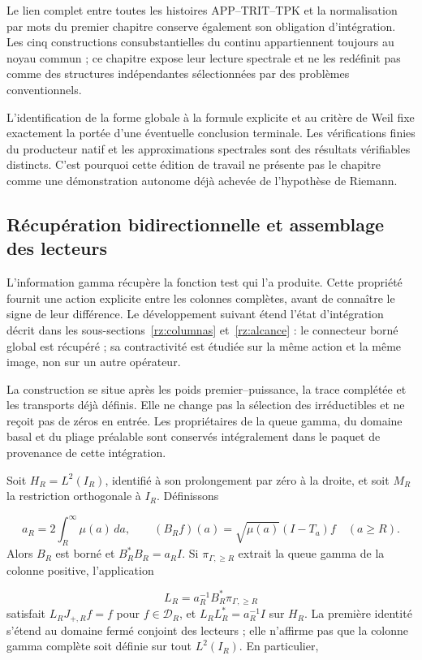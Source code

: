 Le lien complet entre toutes les histoires APP–TRIT–TPK et la normalisation par mots du premier chapitre conserve également son obligation d’intégration. Les cinq constructions consubstantielles du continu appartiennent toujours au noyau commun ; ce chapitre expose leur lecture spectrale et ne les redéfinit pas comme des structures indépendantes sélectionnées par des problèmes conventionnels.

L'identification de la forme globale à la formule explicite et au critère de Weil fixe exactement la portée d'une éventuelle conclusion terminale. Les vérifications finies du producteur natif et les approximations spectrales sont des résultats vérifiables distincts. C'est pourquoi cette édition de travail ne présente pas le chapitre comme une démonstration autonome déjà achevée de l'hypothèse de Riemann.

\subsection{Récupération bidirectionnelle et assemblage des lecteurs}
\label{rz:gamma}
L’information gamma récupère la fonction test qui l’a produite. Cette propriété fournit une action explicite entre les colonnes complètes, avant de connaître le signe de leur différence. Le développement suivant étend l’état d’intégration décrit dans les sous-sections~\ref{rz:columnas} et~\ref{rz:alcance} : le connecteur borné global est récupéré ; sa contractivité est étudiée sur la même action et la même image, non sur un autre opérateur.

La construction se situe après les poids premier–puissance, la trace complétée et les transports déjà définis. Elle ne change pas la sélection des irréductibles et ne reçoit pas de zéros en entrée. Les propriétaires de la queue gamma, du domaine basal et du pliage préalable sont conservés intégralement dans le paquet de provenance de cette intégration.

Soit \(H_R=L^2(I_R)\), identifié à son prolongement par zéro à la droite, et soit \(M_R\) la restriction orthogonale à \(I_R\). Définissons

\[
a_R=2\int_R^\infty\mu(a)\,da,\qquad
(B_Rf)(a)=\sqrt{\mu(a)}(I-T_a)f\quad(a\geq R).
\]
Alors \(B_R\) est borné et \(B_R^*B_R=a_RI\). Si \(\pi_{\Gamma,\geq R}\) extrait la queue gamma de la colonne positive, l’application

\[
L_R=a_R^{-1}B_R^*\pi_{\Gamma,\geq R}
\]
satisfait \(L_RJ_{+,R}f=f\) pour \(f\in\mathcal D_R\), et \(L_RL_R^*=a_R^{-1}I\) sur \(H_R\). La première identité s’étend au domaine fermé conjoint des lecteurs ; elle n’affirme pas que la colonne gamma complète soit définie sur tout \(L^2(I_R)\). En particulier,

